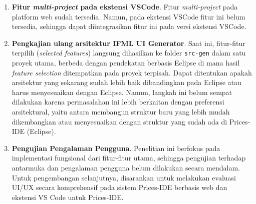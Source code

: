 \documentclass[12pt,a4paper,onecolumn]{article}
\begin{document}
\begin{enumerate}[leftmargin=*]
\item \textbf{Fitur \textit{multi-project} pada ekstensi VSCode}. Fitur \textit{multi-project} pada platform web sudah tersedia. Namun, pada ekstensi VSCode fitur ini belum tersedia, sehingga dapat diintegrasikan fitur ini pada versi ekstensi VSCode.
  
\item \textbf{Pengkajian ulang arsitektur IFML UI Generator}. Saat ini, fitur-fitur terpilih (\textit{selected features}) langsung dihasilkan ke folder \texttt{src-gen} dalam satu proyek utama, berbeda dengan pendekatan berbasis Eclipse di mana hasil \textit{feature selection} ditempatkan pada proyek terpisah. Dapat ditentukan apakah arsitektur yang sekarang sudah lebih baik dibandingkan pada Eclipse atau harus menyesuaikan dengan Eclipse. Namun, langkah ini belum sempat dilakukan karena permasalahan ini lebih berkaitan dengan preferensi arsitektural, yaitu antara membangun struktur baru yang lebih mudah dikembangkan atau menyesuaikan dengan struktur yang sudah ada di Prices-IDE (Eclipse).

\item \textbf{Pengujian Pengalaman Pengguna}. Penelitian ini berfokus pada implementasi fungsional dari fitur-fitur utama, sehingga pengujian terhadap antarmuka dan pengalaman pengguna belum dilakukan secara mendalam. Untuk pengembangan selanjutnya, disarankan untuk melakukan evaluasi UI/UX secara komprehensif pada sistem Prices-IDE berbasis web dan ekstensi VS Code untuk Prices-IDE.

\end{enumerate}



\end{document}
